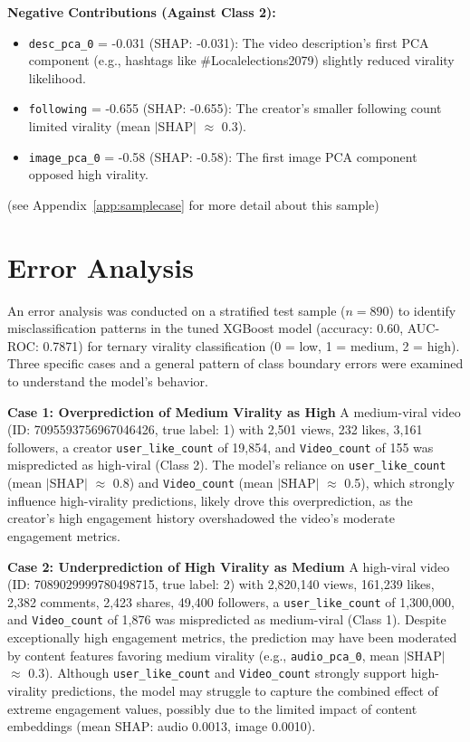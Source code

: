 \documentclass[12pt,a4paper]{report}
\begin{document}
\textbf{Negative Contributions (Against Class 2):}
\begin{itemize}
    \item \texttt{desc\_pca\_0} = -0.031 (SHAP: -0.031): The video description’s first PCA component (e.g., hashtags like \#Localelections2079) slightly reduced virality likelihood.
    \item \texttt{following} = -0.655 (SHAP: -0.655): The creator’s smaller following count limited virality (mean $|$SHAP$|$ $\approx$ 0.3).
    \item \texttt{image\_pca\_0} = -0.58 (SHAP: -0.58): The first image PCA component opposed high virality.
\end{itemize}
(see Appendix~\ref{app:samplecase} for more detail about this sample)
\newpage


\newpage
\section{Error Analysis}
An error analysis was conducted on a stratified test sample ($n=890$) to identify misclassification patterns in the tuned XGBoost model (accuracy: 0.60, AUC-ROC: 0.7871) for ternary virality classification (0 = low, 1 = medium, 2 = high). Three specific cases and a general pattern of class boundary errors were examined to understand the model’s behavior.

\textbf{Case 1: Overprediction of Medium Virality as High}
A medium-viral video (ID: 7095593756967046426, true label: 1) with 2,501 views, 232 likes, 3,161 followers, a creator \texttt{user\_like\_count} of 19,854, and \texttt{Video\_count} of 155 was mispredicted as high-viral (Class 2). The model’s reliance on \texttt{user\_like\_count} (mean $|$SHAP$|$ $\approx$ 0.8) and \texttt{Video\_count} (mean $|$SHAP$|$ $\approx$ 0.5), which strongly influence high-virality predictions, likely drove this overprediction, as the creator’s high engagement history overshadowed the video’s moderate engagement metrics.

\textbf{Case 2: Underprediction of High Virality as Medium}
A high-viral video (ID: 7089029999780498715, true label: 2) with 2,820,140 views, 161,239 likes, 2,382 comments, 2,423 shares, 49,400 followers, a \texttt{user\_like\_count} of 1,300,000, and \texttt{Video\_count} of 1,876 was mispredicted as medium-viral (Class 1). Despite exceptionally high engagement metrics, the prediction may have been moderated by content features favoring medium virality (e.g., \texttt{audio\_pca\_0}, mean $|$SHAP$|$ $\approx$ 0.3). Although \texttt{user\_like\_count} and \texttt{Video\_count} strongly support high-virality predictions, the model may struggle to capture the combined effect of extreme engagement values, possibly due to the limited impact of content embeddings (mean SHAP: audio 0.0013, image 0.0010).
\end{document}
